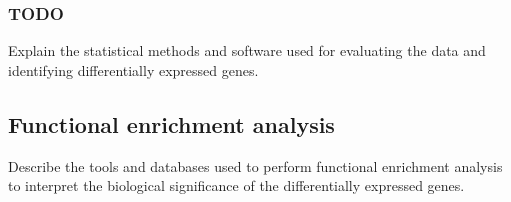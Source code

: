 \subsubsection{TODO}

Explain the statistical methods and software used for evaluating the data and identifying differentially expressed genes.


\subsection{Functional enrichment analysis}
Describe the tools and databases used to perform functional enrichment analysis to interpret the biological significance of the differentially expressed genes.